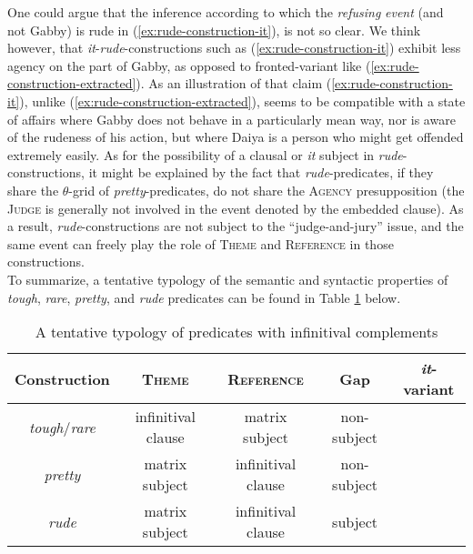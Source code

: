 \documentclass[11pt]{article}
\newcommand{\cmark}{\ding{51}}
\newcommand{\xmark}{\ding{55}}
\begin{document}
	One could argue that the inference according to which the \textit{refusing} \textit{event} (and not Gabby) is rude in (\ref{ex:rude-construction-it}), is not so clear. We think however, that \textit{it}-\textit{rude}-constructions such as (\ref{ex:rude-construction-it}) exhibit less agency on the part of Gabby, as opposed to fronted-variant like (\ref{ex:rude-construction-extracted}). As an illustration of that claim (\ref{ex:rude-construction-it}), unlike (\ref{ex:rude-construction-extracted}), seems to be compatible with a state of affairs where Gabby does not behave in a particularly mean way, nor is aware of the rudeness of his action, but where Daiya is a person who might get offended extremely easily. As for the possibility of a clausal or \textit{it} subject in \textit{rude}-constructions, it might be explained by the fact that \textit{rude}-predicates, if they share the $\theta$-grid of \textit{pretty}-predicates, do not share the \textsc{Agency} presupposition (the \textsc{Judge} is generally not involved in the event denoted by the embedded clause). As a result, \textit{rude}-constructions are not subject to the ``judge-and-jury'' issue, and the same event can freely play the role of \textsc{Theme} and \textsc{Reference} in those constructions. \\
		

	To summarize, a tentative typology of the semantic and syntactic properties of \textit{tough}, \textit{rare}, \textit{pretty}, and \textit{rude} predicates can be found in Table \ref{tab:typology} below.
	\begin{table}[H]
		\centering
		\begin{tabular}{|c|c|c|c|c|}
			\hline
			Construction & \textsc{Theme} & \textsc{Reference} & Gap & \textit{it}-variant \\ \hline
			\textit{tough}/\textit{rare} & infinitival clause & matrix subject & non-subject & \cmark \\
			\textit{pretty} & matrix subject & infinitival clause & non-subject & \xmark \\
			\textit{rude} & matrix subject & infinitival clause & subject & \cmark \\ \hline
		\end{tabular}
	\caption{A tentative typology of predicates with infinitival complements}
	\label{tab:typology}
	\end{table}
\end{document}
